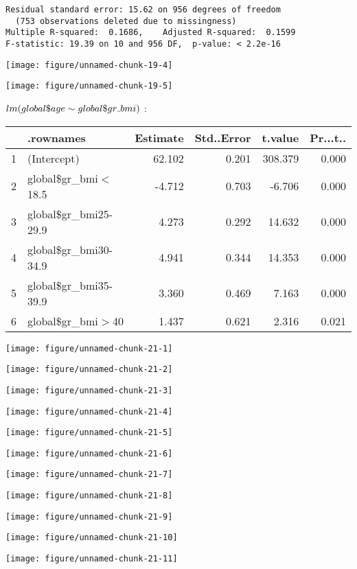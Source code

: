 \documentclass[11pt,a4paper]{article}\usepackage[]{graphicx}\usepackage[]{color}
\makeatletter
\def\maxwidth{ %
  \ifdim\Gin@nat@width>\linewidth
    \linewidth
  \else
    \Gin@nat@width
  \fi
}
\newenvironment{kframe}{%
 \def\at@end@of@kframe{}%
 \ifinner\ifhmode%
  \def\at@end@of@kframe{\end{minipage}}%
  \begin{minipage}{\columnwidth}%
 \fi\fi%
 \def\FrameCommand##1{\hskip\@totalleftmargin \hskip-\fboxsep
 \colorbox{shadecolor}{##1}\hskip-\fboxsep
     \hskip-\linewidth \hskip-\@totalleftmargin \hskip\columnwidth}%
 \MakeFramed {\advance\hsize-\width
   \@totalleftmargin\z@ \linewidth\hsize
   \@setminipage}}%
 {\par\unskip\endMakeFramed%
 \at@end@of@kframe}
\newenvironment{knitrout}{}{} %
\makeatother
\begin{document}
\begin{knitrout}
\begin{kframe}
\begin{verbatim}
Residual standard error: 15.62 on 956 degrees of freedom
  (753 observations deleted due to missingness)
Multiple R-squared:  0.1686,	Adjusted R-squared:  0.1599 
F-statistic: 19.39 on 10 and 956 DF,  p-value: < 2.2e-16
\end{verbatim}
\end{kframe}
\texttt{[image: figure/unnamed-chunk-19-4]} 

\texttt{[image: figure/unnamed-chunk-19-5]} 

\end{knitrout}

$lm(global\mathdollar age\sim global\mathdollar gr\mathunderscore bmi)$ :

\begin{table}[H]
\centering
\begin{tabular}{rlrrrr}
  \hline
 & .rownames & Estimate & Std..Error & t.value & Pr...t.. \\ 
  \hline
1 & (Intercept) & 62.102 & 0.201 & 308.379 & 0.000 \\ 
  2 & global\$gr\_bmi$<$18.5 & -4.712 & 0.703 & -6.706 & 0.000 \\ 
  3 & global\$gr\_bmi25-29.9 & 4.273 & 0.292 & 14.632 & 0.000 \\ 
  4 & global\$gr\_bmi30-34.9 & 4.941 & 0.344 & 14.353 & 0.000 \\ 
  5 & global\$gr\_bmi35-39.9 & 3.360 & 0.469 & 7.163 & 0.000 \\ 
  6 & global\$gr\_bmi$>$40 & 1.437 & 0.621 & 2.316 & 0.021 \\ 
   \hline
\end{tabular}
\end{table}


\begin{knitrout}
\color{fgcolor}
\texttt{[image: figure/unnamed-chunk-21-1]} 

\texttt{[image: figure/unnamed-chunk-21-2]} 

\texttt{[image: figure/unnamed-chunk-21-3]} 

\texttt{[image: figure/unnamed-chunk-21-4]} 

\texttt{[image: figure/unnamed-chunk-21-5]} 

\texttt{[image: figure/unnamed-chunk-21-6]} 

\texttt{[image: figure/unnamed-chunk-21-7]} 

\texttt{[image: figure/unnamed-chunk-21-8]} 

\texttt{[image: figure/unnamed-chunk-21-9]} 

\texttt{[image: figure/unnamed-chunk-21-10]} 

\texttt{[image: figure/unnamed-chunk-21-11]} 

\end{knitrout}
\end{document}
